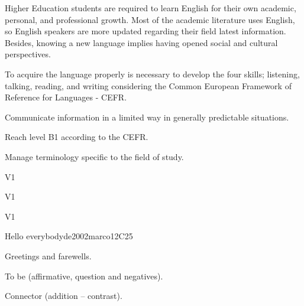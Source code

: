 \begin{syllabus}


\begin{justification}
Higher Education students are required to learn English for their own academic, 
personal, and professional growth. Most of the academic literature uses English, 
so English speakers are more updated regarding their field latest information. 
Besides, knowing a new language implies having opened social and 
cultural perspectives.  

To acquire the language properly is necessary to develop the four skills;
listening, talking, reading, and writing considering the 
Common European Framework of Reference for Languages - CEFR.
\end{justification}

\begin{goals}
\item Communicate information in a limited way in generally predictable situations.
\item Reach level B1 according to the CEFR.
\item Manage terminology specific to the field of study.
\end{goals}

\begin{outcomes}{V1}
\item {}
\end{outcomes}

\begin{specificoutcomes}{V1}
\item {}
\item {}
\item {}
\item {}
\end{specificoutcomes}

\begin{competences}{V1}
    \item {}
\end{competences}

\begin{unit}{Hello everybody}{}{de2002marco}{12}{C25}
   \begin{topics}
      \item Greetings and farewells.
      \item To be (affirmative, question and negatives).
      \item Connector (addition – contrast).
   \end{topics}


\end{unit}
\end{syllabus}
